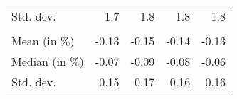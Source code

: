 \begin{tabular}{lllll}
\multicolumn{1}{l}{\hspace{2em}Std. dev.} &
  \multicolumn{1}{|r}{1.7} &
  \multicolumn{1}{r}{1.8} &
  \multicolumn{1}{r}{1.8} &
  \multicolumn{1}{r}{1.8} \\
\multicolumn{1}{l}{\hspace{1em}{\textit{Elasticity} ($\widehat{\beta}$)}} &
  \multicolumn{1}{|r}{} &
  \multicolumn{1}{r}{} &
  \multicolumn{1}{r}{} &
  \multicolumn{1}{r}{} \\
\multicolumn{1}{l}{\hspace{2em}Mean (in $\%$)} &
  \multicolumn{1}{|r}{-0.13} &
  \multicolumn{1}{r}{-0.15} &
  \multicolumn{1}{r}{-0.14} &
  \multicolumn{1}{r}{-0.13} \\
\multicolumn{1}{l}{\hspace{2em}Median (in $\%$)} &
  \multicolumn{1}{|r}{-0.07} &
  \multicolumn{1}{r}{-0.09} &
  \multicolumn{1}{r}{-0.08} &
  \multicolumn{1}{r}{-0.06} \\
\multicolumn{1}{l}{\hspace{2em}Std. dev.} &
  \multicolumn{1}{|r}{0.15} &
  \multicolumn{1}{r}{0.17} &
  \multicolumn{1}{r}{0.16} &
  \multicolumn{1}{r}{0.16} \\
\cline{1-5}
\end{tabular}
